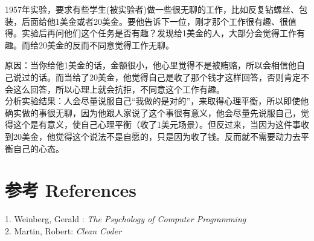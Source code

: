 1957年实验，要求有些学生(被实验者)做一些很无聊的工作，比如反复钻螺丝、包装，后面给他1美金或者20美金。要他告诉下一位，刚才那个工作很有趣、很值得。实验后再问他们这个任务是否有趣？发现给1美金的人，大部分会觉得工作有趣。而给20美金的反而不同意觉得工作无聊。

原因：当你给他1美金的话，金额很小，他心里觉得不是被贿赂，所以会相信他自己说过的话。而当给了20美金，他觉得自己是收了那个钱才这样回答，否则肯定不会这么回答，所以心理上就会抗拒，不同意这个工作有趣。\\
分析实验结果：人会尽量说服自己``我做的是对的''，来取得心理平衡，所以即使他确实做的事很无聊，因为他跟人家说了这个事很有意义，他会尽量先说服自己，觉得这个是有意义，使自己心理平衡（收了1美元场景）。但反过来，当因为这件事收到20美金，他觉得这个说法不是自愿的，只是因为收了钱。反而就不需要动力去平衡自己的心态。\\

\hypertarget{ux9644ux4ef6}{%
\section{参考 References}\label{ux9644ux4ef6}}

1. Weinberg, Gerald : \emph{The Psychology of Computer Programming}\\
2. Martin, Robert: \emph{Clean Coder}\\




